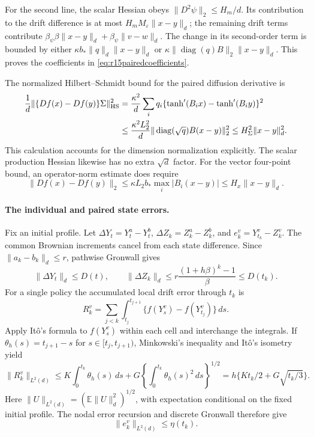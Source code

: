 For the second line, the scalar Hessian obeys
$\|D^2\psi\|_2\leq H_m/d$. Its contribution to the drift difference
is at most $H_mM_\varepsilon\|x-y\|_d$; the remaining drift terms
contribute $\beta_\psi\beta\|x-y\|_d+
\beta_\psi\|v-w\|_d$.
The change in its second-order term is bounded by either
$\kappa b_*\|q\|_d\|x-y\|_d$ or
$\kappa\|\operatorname{diag}(q)B\|_2\|x-y\|_d$.
This proves the coefficients in \eqref{eq:r15pairedcoefficients}.

The normalized Hilbert--Schmidt bound for the paired diffusion derivative is
\begin{align}
 \frac1d\|\{Df(x)-Df(y)\}\Sigma\|_{\rm HS}^2
 &=\frac{\kappa^2}{d}\sum_i q_i
        \{\tanh'(B_i x)-\tanh'(B_i y)\}^2\notag\\
 &\leq\frac{\kappa^2L_2^2}{d}
            \|\operatorname{diag}(\sqrt q)B(x-y)\|_2^2
 \leq H_\Sigma^2\|x-y\|_d^2.
 \label{eq:r15pairedhsmatrix}
\end{align}
This calculation accounts for the dimension normalization explicitly.
The scalar production Hessian likewise has no extra $\sqrt d$ factor.
For the vector four-point bound, an operator-norm estimate does require
\[
 \|Df(x)-Df(y)\|_2
 \leq\kappa L_2 b_*\max_i|B_i(x-y)|
 \leq H_x\|x-y\|_d.
\]

\paragraph*{The individual and paired state errors.}
Fix an initial profile. Let
$\Delta Y_t=Y_t^a-Y_t^b$, $\Delta Z_k=Z_k^a-Z_k^b$, and
$e_k^v=Y_{t_k}^v-Z_k^v$.
The common Brownian increments cancel from each state difference. Since
$\|a_k-b_k\|_d\leq r$, pathwise Gronwall gives
\begin{equation}
 \|\Delta Y_t\|_d\leq D(t),\qquad
 \|\Delta Z_k\|_d\leq
       r\frac{(1+h\beta)^k-1}{\beta}\leq D(t_k).
 \label{eq:r15paireddistance}
\end{equation}
For a single policy the accumulated local drift error through $t_k$ is
\[
 R_k^v=\sum_{j<k}\int_{t_j}^{t_{j+1}}
                 \{f(Y_s^v)-f(Y_{t_j}^v)\}\,ds.
\]
Apply It\^o's formula to $f(Y_s^v)$ within each cell and interchange
the integrals. If $\theta_h(s)=t_{j+1}-s$ for
$s\in[t_j,t_{j+1})$, Minkowski's inequality and It\^o's isometry yield
\[
 \|R_k^v\|_{L^2(d)}
 \leq K\int_0^{t_k}\theta_h(s)\,ds
       +G\left\{\int_0^{t_k}\theta_h(s)^2\,ds\right\}^{1/2}
 =h\{Kt_k/2+G\sqrt{t_k/3}\}.
\]
Here $\|U\|_{L^2(d)}=(\mathbb E\|U\|_d^2)^{1/2}$, with
expectation conditional on the fixed initial profile. The nodal error
recursion and discrete Gronwall therefore give
\begin{equation}
 \|e_k^v\|_{L^2(d)}\leq\eta(t_k).
 \label{eq:r15pairedsingleerror}
\end{equation}

